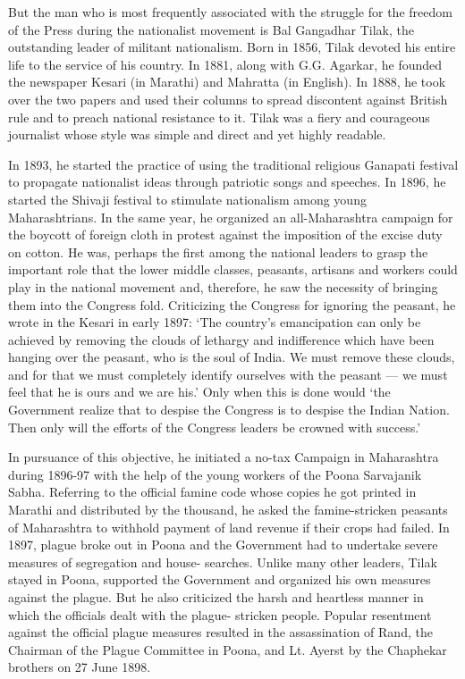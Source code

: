 But the man who is most frequently associated with the struggle for the freedom of the Press during the nationalist movement is Bal Gangadhar Tilak, the outstanding leader of militant nationalism. Born in 1856, Tilak devoted his entire life to the service of his country. In 1881, along with G.G. Agarkar, he founded the newspaper Kesari (in Marathi) and Mahratta (in English). In 1888, he took over the two papers and used their columns to spread discontent against British rule and to preach national resistance to it. Tilak was a fiery and courageous journalist whose style was simple and direct and yet highly readable.

In 1893, he started the practice of using the traditional religious Ganapati festival to propagate nationalist ideas through patriotic songs and speeches. In 1896, he started the Shivaji festival to stimulate nationalism among young Maharashtrians. In the same year, he organized an all-Maharashtra campaign for the boycott of foreign cloth in protest against the imposition of the excise duty on cotton. He was, perhaps the first among the national leaders to grasp the important role that the lower middle classes, peasants, artisans and workers could play in the national movement and, therefore, he saw the necessity of bringing them into the Congress fold. Criticizing the Congress for ignoring the peasant, he wrote in the Kesari in early 1897: ‘The country’s emancipation can only be achieved by removing the clouds of lethargy and indifference which have been hanging over the peasant, who is the soul of India. We must remove these clouds, and for that we must completely identify ourselves with the peasant --- we must feel that he is ours and we are his.’ Only when this is done would ‘the Government realize that to despise the Congress is to despise the Indian Nation. Then only will the efforts of the Congress leaders be crowned with success.’

In pursuance of this objective, he initiated a no-tax Campaign in Maharashtra during 1896-97 with the help of the young workers of the Poona Sarvajanik Sabha. Referring to the official famine code whose copies he got printed in Marathi and distributed by the thousand, he asked the famine-stricken peasants of Maharashtra to withhold payment of land revenue if their crops had failed. In 1897, plague broke out in Poona and the Government had to undertake severe measures of segregation and house- searches. Unlike many other leaders, Tilak stayed in Poona, supported the Government and organized his own measures against the plague. But he also criticized the harsh and heartless manner in which the officials dealt with the plague- stricken people. Popular resentment against the official plague measures resulted in the assassination of Rand, the Chairman of the Plague Committee in Poona, and Lt. Ayerst by the Chaphekar brothers on 27 June 1898.

